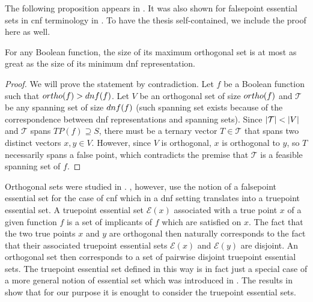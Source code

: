 The following proposition appears
in \citet{Dubovsky2012}.
It was also shown for falsepoint
essential sets in \acrfull{cnf} terminology
in \citet{Cepek2012}.
To have the thesis self-contained,
we include the proof here as well.

\begin{theorem}
[$\apply{ortho}{f} \leq \apply{dnf}{f}$
{\theoremsource[Observation 1.1]{Dubovsky2012}} %
{\theoremsource[Theorem 2.8, Corollary 3.2]{Cepek2012}}] %
\label{theorem:orthodnf}
For any Boolean function,
the size of its maximum orthogonal set
is at most as great
as the size of its minimum \acrshort{dnf} representation.
\end{theorem}

\begin{proof}
We will prove the statement by contradiction.
Let $f$ be a Boolean function such that
$ortho (f) > dnf (f)$.
Let $V$ be an orthogonal set of size $ortho (f)$
and $\mathcal{T}$ be any spanning set
of size $dnf (f)$
(such spanning set exists because of the correspondence
between \acrshort{dnf} representations and spanning sets).
Since $\lvert\mathcal{T}\rvert < \lvert V\rvert$
and $\mathcal{T}$ spans $TP(f) \supseteq S$,
there must be a ternary vector $T \in \mathcal{T}$
that spans
two distinct vectors $x, y \in V$.
However,
since $V$ is orthogonal,
$x$ is orthogonal to $y$,
so $T$ necessarily spans a false point,
which contradicts the premise that $\mathcal{T}$
is a feasible spanning set of $f$.
\end{proof}

\begin{remark}
\label{remark:cepeknotation}
Orthogonal sets were studied in \citet{Cepek2012}.
\citeauthor{Cepek2012}, however,
use the notion of a falsepoint essential set
for the case of \acrlong{cnf}
which in a \acrshort{dnf} setting
translates into a truepoint essential set.
A truepoint essential set $\mathcal{E}(x)$
associated with a true point $x$
of a given function $f$
is a set of implicants
of $f$ which are satisfied on $x$.
The fact that the two true points $x$ and $y$
are orthogonal then naturally corresponds to
the fact that their associated truepoint essential sets
$\mathcal{E}(x)$ and $\mathcal{E}(y)$ are disjoint.
An orthogonal set then corresponds
to a set of pairwise disjoint truepoint essential sets.
The truepoint essential set defined in this way
is in fact just a special case of a more general notion
of essential set which was introduced in \citet{Boros2010}.
The results in \citet{Cepek2012}
show that for our purpose it is enought
to consider the truepoint essential sets.
\end{remark}


